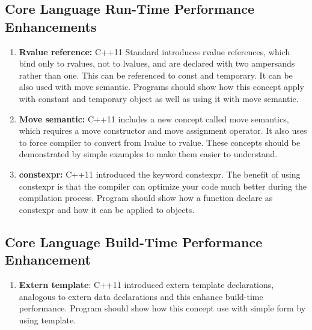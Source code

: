 \documentclass[11pt,]{report}
\begin{document}
\subsection{Core Language Run-Time Performance Enhancements}
\begin{enumerate}

\item \textbf{Rvalue reference:} C++11 Standard introduces rvalue references, which bind only to rvalues, not
to lvalues, and are declared with two ampersands rather than one. This can be referenced to const and temporary. It can be also used with move semantic. Programs should show how this concept apply with constant and temporary object as well as using it with move semantic.

\item \textbf{Move semantic:} C++11 includes a new concept called move \linebreak semantics, which requires a move constructor and move assignment \linebreak operator. It also uses to force compiler to convert from Ivalue to rvalue. These concepts should be demonstrated by simple examples to make them easier to understand.

\item \textbf{constexpr:} C++11 introduced the keyword constexpr. The benefit of using constexpr is that the compiler can optimize your code much better during the compilation process. Program should show how a function declare as constexpr and how it can  be applied to objects.
\end{enumerate}


\subsection{Core Language Build-Time Performance Enhancement}
\begin{enumerate}

\item \textbf{Extern template}:  C++11 introduced extern template declarations, analogous to extern data declarations and this enhance build-time \linebreak performance. Program should show how this concept use with simple form by using template.
\end{enumerate}
\end{document}
